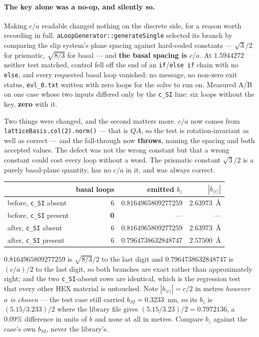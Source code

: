 \documentclass[11pt]{article}
\newcommand{\cloop}{\ensuremath{\langle c\rangle}}
\newcommand{\code}[1]{\texttt{\small #1}}
\newcommand{\file}[1]{\texttt{\footnotesize #1}}
\begin{document}
\paragraph{The key alone was a no-op, and silently so.} Making $c/a$ readable
changed nothing on the discrete side, for a reason worth recording in full.
\code{aLoopGenerator::generateSingle} selected its branch by comparing the slip
system's plane spacing against hard-coded constants --- $\sqrt3/2$ for
prismatic, $\sqrt{8/3}$ for basal --- and \textbf{the basal spacing is $c/a$}.
At $1.5944272$ neither test matched, control fell off the end of an
\code{if}/\code{else if} chain with no \code{else}, and every requested basal
loop vanished: no message, no non-zero exit status, \file{evl\_0.txt} written
with zero loops for the solve to run on. Measured A/B on one case whose two
inputs differed only by the \code{c\_SI} line: six loops without the key,
\textbf{zero} with it.

Two things were changed, and the second matters more. $c/a$ now comes from
\code{latticeBasis.col(2).norm()} --- that is $QA$, so the test is
rotation-invariant as well as correct --- and the fall-through now
\textbf{throws}, naming the spacing and both accepted values. The defect was not
the wrong constant but that a wrong constant could cost every loop without a
word. The prismatic constant $\sqrt3/2$ is a purely basal-plane quantity, has no
$c/a$ in it, and was always correct.

\begin{center}
\begin{tabular}{@{}lrrr@{}}
\toprule
 & basal loops & emitted $b_z$ & $|b_{\cloop{}}|$ \\
\midrule
before, \code{c\_SI} absent  & 6          & $0.8164965809277259$ & $2.63973$~\AA{} \\
before, \code{c\_SI} present & \textbf{0} & ---                  & --- \\
after, \code{c\_SI} absent   & 6          & $0.8164965809277259$ & $2.63973$~\AA{} \\
after, \code{c\_SI} present  & 6          & $0.7964738632848747$ & $\mathbf{2.57500}$~\AA{} \\
\bottomrule
\end{tabular}
\end{center}

\noindent
$0.8164965809277259$ is $\sqrt{8/3}/2$ to the last digit and
$0.7964738632848747$ is $(c/a)/2$ to the last digit, so both branches are exact
rather than approximately right; and the two \code{c\_SI}-absent rows are
identical, which is the regression test that every other HEX material is
untouched. Note $|b_{\cloop{}}| = c/2$ in metres \emph{however $a$ is chosen} ---
the test case still carried $b_{SI} = 0.3233$~nm, so its $b_z$ is
$(5.15/3.233)/2$ where the library file gives $(5.15/3.23)/2 = 0.7972136$, a
$0.09\%$ difference in units of $b$ and none at all in metres. Compare $b_z$
against the case's own $b_{SI}$, never the library's.
\end{document}
